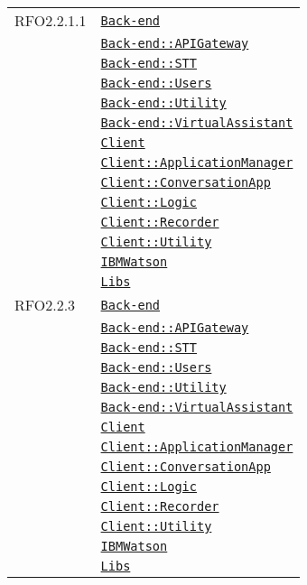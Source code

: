 \begin{longtable}{|>{\centering}m{3cm}|m{10cm}<{\centering}|}
RFO2.2.1.1 & \hyperref[Back-end]{\texttt{Back-end}}\\
& \hyperref[Back-end::APIGateway]{\texttt{Back-end::APIGateway}}\\
& \hyperref[Back-end::STT]{\texttt{Back-end::STT}}\\
& \hyperref[Back-end::Users]{\texttt{Back-end::Users}}\\
& \hyperref[Back-end::Utility]{\texttt{Back-end::Utility}}\\
& \hyperref[Back-end::VirtualAssistant]{\texttt{Back-end::VirtualAssistant}}\\
& \hyperref[Client]{\texttt{Client}}\\
& \hyperref[Client::ApplicationManager]{\texttt{Client::ApplicationManager}}\\
& \hyperref[Client::ConversationApp]{\texttt{Client::ConversationApp}}\\
& \hyperref[Client::Logic]{\texttt{Client::Logic}}\\
& \hyperref[Client::Recorder]{\texttt{Client::Recorder}}\\
& \hyperref[Client::Utility]{\texttt{Client::Utility}}\\
& \hyperref[IBMWatson]{\texttt{IBMWatson}}\\
& \hyperref[Libs]{\texttt{Libs}}\\ \hline

RFO2.2.3 & \hyperref[Back-end]{\texttt{Back-end}}\\
& \hyperref[Back-end::APIGateway]{\texttt{Back-end::APIGateway}}\\
& \hyperref[Back-end::STT]{\texttt{Back-end::STT}}\\
& \hyperref[Back-end::Users]{\texttt{Back-end::Users}}\\
& \hyperref[Back-end::Utility]{\texttt{Back-end::Utility}}\\
& \hyperref[Back-end::VirtualAssistant]{\texttt{Back-end::VirtualAssistant}}\\
& \hyperref[Client]{\texttt{Client}}\\
& \hyperref[Client::ApplicationManager]{\texttt{Client::ApplicationManager}}\\
& \hyperref[Client::ConversationApp]{\texttt{Client::ConversationApp}}\\
& \hyperref[Client::Logic]{\texttt{Client::Logic}}\\
& \hyperref[Client::Recorder]{\texttt{Client::Recorder}}\\
& \hyperref[Client::Utility]{\texttt{Client::Utility}}\\
& \hyperref[IBMWatson]{\texttt{IBMWatson}}\\
& \hyperref[Libs]{\texttt{Libs}}\\ \hline


\end{longtable}
